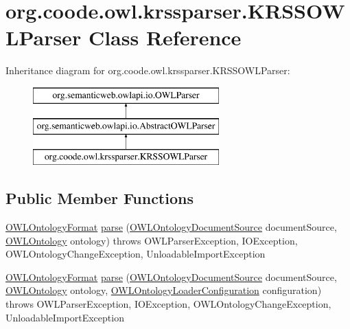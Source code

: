 \hypertarget{classorg_1_1coode_1_1owl_1_1krssparser_1_1_k_r_s_s_o_w_l_parser}{\section{org.\-coode.\-owl.\-krssparser.\-K\-R\-S\-S\-O\-W\-L\-Parser Class Reference}
\label{classorg_1_1coode_1_1owl_1_1krssparser_1_1_k_r_s_s_o_w_l_parser}
}
Inheritance diagram for org.\-coode.\-owl.\-krssparser.\-K\-R\-S\-S\-O\-W\-L\-Parser\-:\begin{figure}[H]
\begin{center}
\leavevmode
\includegraphics[height=3.000000cm]{classorg_1_1coode_1_1owl_1_1krssparser_1_1_k_r_s_s_o_w_l_parser}
\end{center}
\end{figure}
\subsection*{Public Member Functions}
\begin{DoxyCompactItemize}
\item 
\hyperlink{classorg_1_1semanticweb_1_1owlapi_1_1model_1_1_o_w_l_ontology_format}{O\-W\-L\-Ontology\-Format} \hyperlink{classorg_1_1coode_1_1owl_1_1krssparser_1_1_k_r_s_s_o_w_l_parser_a03a76fcad20f37c21233a6f5de579919}{parse} (\hyperlink{interfaceorg_1_1semanticweb_1_1owlapi_1_1io_1_1_o_w_l_ontology_document_source}{O\-W\-L\-Ontology\-Document\-Source} document\-Source, \hyperlink{interfaceorg_1_1semanticweb_1_1owlapi_1_1model_1_1_o_w_l_ontology}{O\-W\-L\-Ontology} ontology)  throws O\-W\-L\-Parser\-Exception, I\-O\-Exception,             O\-W\-L\-Ontology\-Change\-Exception, Unloadable\-Import\-Exception 
\item 
\hyperlink{classorg_1_1semanticweb_1_1owlapi_1_1model_1_1_o_w_l_ontology_format}{O\-W\-L\-Ontology\-Format} \hyperlink{classorg_1_1coode_1_1owl_1_1krssparser_1_1_k_r_s_s_o_w_l_parser_ab002825f3234dfadd985eae88a845d25}{parse} (\hyperlink{interfaceorg_1_1semanticweb_1_1owlapi_1_1io_1_1_o_w_l_ontology_document_source}{O\-W\-L\-Ontology\-Document\-Source} document\-Source, \hyperlink{interfaceorg_1_1semanticweb_1_1owlapi_1_1model_1_1_o_w_l_ontology}{O\-W\-L\-Ontology} ontology, \hyperlink{classorg_1_1semanticweb_1_1owlapi_1_1model_1_1_o_w_l_ontology_loader_configuration}{O\-W\-L\-Ontology\-Loader\-Configuration} configuration)  throws O\-W\-L\-Parser\-Exception, I\-O\-Exception, O\-W\-L\-Ontology\-Change\-Exception,             Unloadable\-Import\-Exception 
\end{DoxyCompactItemize}
